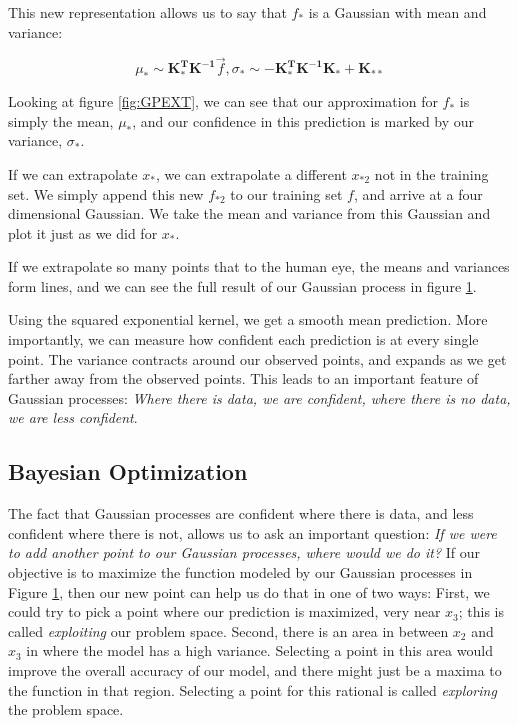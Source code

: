 \documentclass{sig-alternate}
\begin{document}
This new representation allows us to say that $f_{*}$ is a Gaussian with mean and variance:

\[ \mu_{*} \sim \mathbf{K_{*}^{T} K^{-1}} \Vec{f},  \sigma_{*} \sim  -\mathbf{K_{*}^{T} K^{-1} K_{*}} + \mathbf{K_{**}}\]

Looking at figure \ref{fig:GPEXT}, we can see that our approximation for $f_{*}$ is simply the mean, $\mu_{*}$, and our confidence in this prediction is marked by our variance, $\sigma_{*}$.

If we can extrapolate $x_{*}$, we can extrapolate a different $x_{*2}$ not in the training set.
We simply append this new $f_{*2}$ to our training set $f$, and arrive at a four dimensional Gaussian.
We take the mean and variance from this Gaussian and plot it just as we did for $x_{*}$.

If we extrapolate so many points that to the human eye, the means and variances form lines, and we can see the full result of our Gaussian process in figure \ref{fig:GP-Complete}.

\begin{figure}[htb]
\centering
{}
\caption{}
\label{fig:GP-Complete}
\end{figure}

Using the squared exponential kernel, we get a smooth mean prediction.
More importantly, we can measure how confident each prediction is at every single point.
The variance contracts around our observed points, and expands as we get farther away from the observed points.
This leads to an important feature of Gaussian processes: \textit{Where there is data, we are confident, where there is no data, we are less confident}.

\subsection{Bayesian Optimization}
\label{bayesianOptimization}

The fact that Gaussian processes are confident where there is data, and less confident where there is not, allows us to ask an important question:
\textit{If we were to add another point to our Gaussian processes, where would we do it?}
If our objective is to maximize the function modeled by our Gaussian processes in Figure \ref{fig:GP-Complete}, then our new point can help us do that in one of two ways:
First, we could try to pick a point where our prediction is maximized, very near $x_3$; this is called \textit{exploiting} our problem space.
Second, there is an area in between $x_2$ and $x_3$ in where the model has a high variance.
Selecting a point in this area would improve the overall accuracy of our model, and there might just be a maxima to the function in that region.
Selecting a point for this rational is called \textit{exploring} the problem space.
\end{document}
